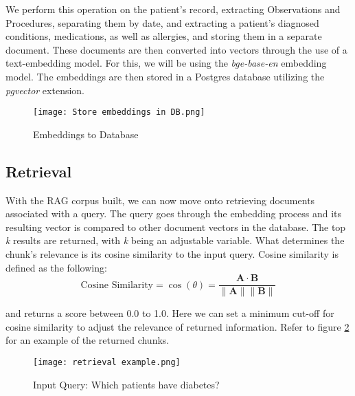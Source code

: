 We perform this operation on the patient's record, extracting Observations and Procedures, separating them by date, and extracting a patient's diagnosed conditions, medications, as well as allergies, and storing them in a separate document.
These documents are then converted into vectors through the use of a text-embedding model.
For this, we will be using the \emph{bge-base-en} embedding model.
The embeddings are then stored in a Postgres database utilizing the \emph{pgvector} extension.

\begin{figure}
	\texttt{[image: Store embeddings in DB.png]}
	\caption{Embeddings to Database}
	\centering
	\label{fig:EmbeddingsDatabase}
\end{figure}

\subsection{Retrieval}
With the RAG corpus built, we can now move onto retrieving documents associated with a query.
The query goes through the embedding process and its resulting vector is compared to other document vectors in the database.
The top \textit{k} results are returned, with \textit{k} being an adjustable variable.
What determines the chunk's relevance is its cosine similarity to the input query.
Cosine similarity is defined as the following:
\[
	\text{Cosine Similarity} = \cos(\theta) = \frac{\mathbf{A} \cdot \mathbf{B}}{\|\mathbf{A}\| \|\mathbf{B}\|}
\]

and returns a score between 0.0 to 1.0.
Here we can set a minimum cut-off for cosine similarity to adjust the relevance of returned information.
Refer to figure \ref{fig:RetrievalExample} for an example of the returned chunks.

\begin{figure}
	\centering
	\texttt{[image: retrieval example.png]}
	\caption{Input Query: Which patients have diabetes?}
	\label{fig:RetrievalExample}
\end{figure}

